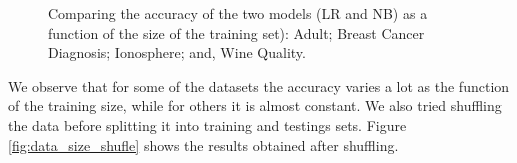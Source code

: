 \documentclass[conference]{IEEEtran}
\begin{document}
\begin{figure}
\hspace{8pt}%
%
\caption[Comparing the accuracy of the two models (LR and NB) as a function of the size of the training set]{Comparing the accuracy of the two models (LR and NB) as a function of the size of the training set):
 Adult;
 Breast Cancer Diagnosis;
 Ionosphere; and,
 Wine Quality.}%
\label{fig:ex3}%
\end{figure}

We observe that for some of the datasets the accuracy varies a lot as the function of the training size, while for others it is almost constant. We also tried shuffling the data before splitting it into training and testings sets. Figure \ref{fig:data_size_shufle} shows the results obtained after shuffling.
\end{document}
